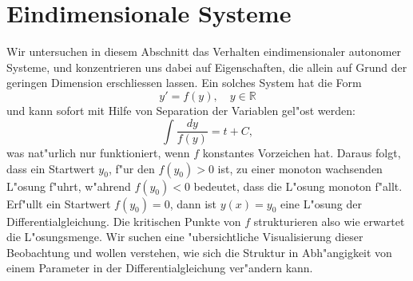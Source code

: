 %
%
\section{Eindimensionale Systeme}
%
%
Wir untersuchen in diesem Abschnitt das Verhalten eindimensionaler autonomer
Systeme, und konzentrieren uns dabei auf Eigenschaften, die allein
auf Grund der geringen Dimension erschliessen lassen.
Ein solches System hat die Form
\[
y'=f(y),\quad y\in\mathbb R
\]
und kann sofort mit Hilfe von Separation der Variablen gel"ost werden:
\[
\int\frac{dy}{f(y)} = t+C,
\]
was nat"urlich nur funktioniert, wenn $f$ konstantes Vorzeichen hat.
Daraus folgt, dass ein Startwert $y_0$, f"ur den $f(y_0)>0$ ist,
zu einer monoton wachsenden L"osung f"uhrt, w"ahrend $f(y_0)<0$
bedeutet, dass die L"osung monoton f"allt.
Erf"ullt ein Startwert $f(y_0)=0$, dann ist $y(x)=y_0$ eine
L"osung der Differentialgleichung.
Die kritischen Punkte von $f$ strukturieren also wie erwartet die
L"osungsmenge.
Wir suchen eine "ubersichtliche Visualisierung dieser Beobachtung
und wollen verstehen, wie sich die Struktur in Abh"angigkeit
von einem Parameter in der Differentialgleichung ver"andern kann.

%
%
